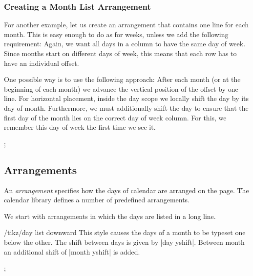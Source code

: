 \subsubsection{Creating a Month List Arrangement}

For another example, let us create an arrangement that contains one line for
each month. This is easy enough to do as for weeks, unless we add the following
requirement: Again, we want all days in a column to have the same day of week.
Since months start on different days of week, this means that each row has to
have an individual offset.

One possible way is to use the following approach: After each month (or at the
beginning of each month) we advance the vertical position of the offset by one
line. For horizontal placement, inside the day scope we locally shift the day
by its day of month. Furthermore, we must additionally shift the day to ensure
that the first day of the month lies on the correct day of week column. For
this, we remember this day of week the first time we see it.
%
\begin{codeexample}[]
\newcount\mycount
\tikz
  \calendar
    [dates=2000-01-01 to 2000-02-last,
     execute before day scope=
     {
       \ifdate{day of month=1} {
         \mycount=\pgfcalendarcurrentweekday
         \pgftransformyshift{-1em}
       }{}
     },
     execute at begin day scope=
     {
       \pgftransformxshift{\pgfcalendarcurrentday em}
       \pgftransformxshift{\the\mycount em}
     }];
\end{codeexample}


\subsection{Arrangements}

An \emph{arrangement} specifies how the days of calendar are arranged on the
page. The calendar library defines a number of predefined arrangements.

We start with arrangements in which the days are listed in a long line.

\begin{stylekey}{/tikz/day list downward}
    This style causes the days of a month to be typeset one below the other.
    The shift between days is given by |day yshift|. Between month an
    additional shift of |month yshift| is added.
\begin{codeexample}[]
\tikz
  \calendar [dates=2000-01-28 to 2000-02-03,
             day list downward,month yshift=1em];
\end{codeexample}
\end{stylekey}


